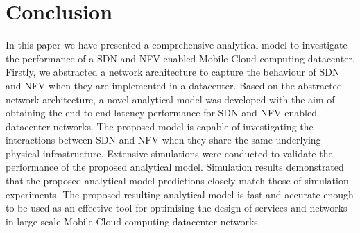 
\section{Conclusion}
\label{sec:conclusions}

In this paper we have presented a comprehensive analytical model to investigate the performance of a SDN and NFV enabled Mobile Cloud computing datacenter. Firstly, we abstracted a network architecture to capture the behaviour of SDN and NFV when they are implemented in a datacenter. Based on the abstracted network architecture, a novel analytical model was developed with the aim of obtaining the end-to-end latency performance for SDN and NFV enabled datacenter networks. The proposed model is capable of investigating the interactions between SDN and NFV when they share the same underlying physical infrastructure. Extensive simulations were conducted to validate the performance of the proposed analytical model. Simulation results demonstrated that the proposed analytical model predictions closely match those of simulation experiments. The proposed resulting analytical model is fast and accurate enough to be used as an effective tool for optimising the design of services and networks in large scale Mobile Cloud computing datacenter networks.